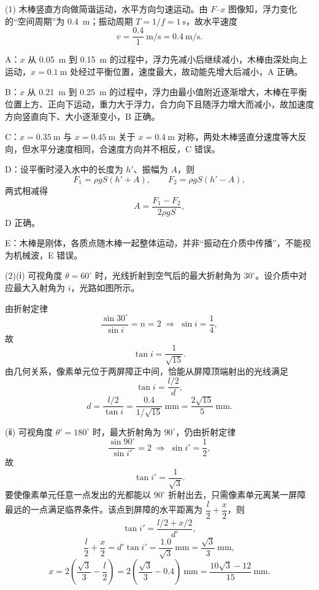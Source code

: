 \begin{answer}
(1) 木棒竖直方向做简谐运动，水平方向匀速运动。由 $F$--$x$ 图像知，浮力变化的“空间周期”为 \SI{0.4}{\metre}；振动周期 $T=1/f=\SI{1}{\second}$，故水平速度
\[
  v=\frac{0.4}{1}~\si{\metre\per\second}=\SI{0.4}{\metre\per\second}.
\]

A：$x$ 从 \SI{0.05}{\metre} 到 \SI{0.15}{\metre} 的过程中，浮力先减小后继续减小，木棒由深处向上运动，$x=\SI{0.1}{\metre}$ 处经过平衡位置，速度最大，故动能先增大后减小，A 正确。

B：$x$ 从 \SI{0.21}{\metre} 到 \SI{0.25}{\metre} 的过程中，浮力由最小值附近逐渐增大，木棒在平衡位置上方、正向下运动，重力大于浮力，合力向下且随浮力增大而减小，故加速度方向竖直向下、大小逐渐变小，B 正确。

C：$x=\SI{0.35}{\metre}$ 与 $x=\SI{0.45}{\metre}$ 关于 $x=\SI{0.4}{\metre}$ 对称，两处木棒竖直分速度等大反向，但水平分速度相同，合速度方向并不相反，C 错误。

D：设平衡时浸入水中的长度为 $h'$、振幅为 $A$，则
\[
  F_{1}=\rho gS(h'+A),\qquad F_{2}=\rho gS(h'-A),
\]
两式相减得
\[
  A=\frac{F_{1}-F_{2}}{2\rho gS},
\]
D 正确。

E：木棒是刚体，各质点随木棒一起整体运动，并非“振动在介质中传播”，不能视为机械波，E 错误。

(2)(ⅰ) 可视角度 $\theta=60^{\circ}$ 时，光线折射到空气后的最大折射角为 $30^{\circ}$。设介质中对应最大入射角为 $i$，光路如图所示。


由折射定律
\[
  \frac{\sin30^{\circ}}{\sin i}=n=2
  \;\Longrightarrow\;
  \sin i=\frac{1}{4},
\]
故
\[
  \tan i=\frac{1}{\sqrt{15}}.
\]
由几何关系，像素单元位于两屏障正中间，恰能从屏障顶端射出的光线满足
\[
  \tan i=\frac{l/2}{d},
\]
\[
  d=\frac{l/2}{\tan i}
  =\frac{0.4}{1/\sqrt{15}}~\si{\milli\metre}
  =\frac{2\sqrt{15}}{5}~\si{\milli\metre}.
\]

(ⅱ) 可视角度 $\theta'=180^{\circ}$ 时，最大折射角为 $90^{\circ}$，仍由折射定律
\[
  \frac{\sin90^{\circ}}{\sin i'}=2
  \;\Longrightarrow\;
  \sin i'=\frac{1}{2},
\]
故
\[
  \tan i'=\frac{1}{\sqrt{3}}.
\]
要使像素单元任意一点发出的光都能以 $90^{\circ}$ 折射出去，只需像素单元离某一屏障最远的一点满足临界条件。该点到屏障的水平距离为 $\dfrac{l}{2}+\dfrac{x}{2}$，则
\[
  \tan i'=\frac{l/2+x/2}{d'},
\]
\[
  \frac{l}{2}+\frac{x}{2}=d'\tan i'=\frac{1.0}{\sqrt{3}}~\si{\milli\metre}
  =\frac{\sqrt{3}}{3}~\si{\milli\metre},
\]
\[
  x=2\left(\frac{\sqrt{3}}{3}-\frac{l}{2}\right)
  =2\left(\frac{\sqrt{3}}{3}-0.4\right)~\si{\milli\metre}
  =\frac{10\sqrt{3}-12}{15}~\si{\milli\metre}.
\]
\end{answer}
